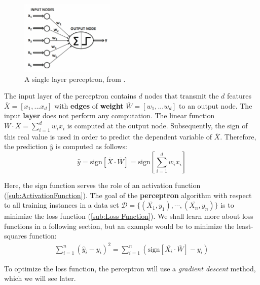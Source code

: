 \documentclass{article}
\begin{document}
\begin{figure} %
    \centering
    \includegraphics[width=0.4\textwidth]{SingleLayerP}
    \caption{A single layer perceptron, from \cite{inbook:Aggarwal-1.2}.}
    \label{fig:SLP}
\end{figure}

The input layer of the {perceptron} contains $d$ nodes that transmit the $d$ features $\overline{X} = [x_1, . . . x_d]$ with \textbf{edges} of \textbf{weight} $\overline{W} = [w_1, . . . w_d]$  to an output node. The input \textbf{layer} does not perform any computation. The linear function $\overline{W} \cdot \overline{X} =\sum^{d}_{i=1}  w_ix_i$ is computed at the output node. Subsequently, the sign of this real value is used in order to predict the dependent variable of $\overline{X}$. Therefore, the prediction $\hat y$ is computed as follows:
    $$\hat y = \text{sign}[\overline{X} \cdot \overline{W}] =\text{sign}\left[\sum^{d}_{i=1}  w_ix_i\right] $$

Here, the sign function serves the role of an activation function (\autoref{sub:ActivationFunction}). The goal of the \textbf{perceptron} algorithm with respect to all training instances in a data set $\mathcal{D} = \{(\overline{X_1}, y_1 ), \cdots,(\overline{X_n}, y_n )\}$ is to minimize the loss function (\autoref{sub:Loss Function}). We shall learn more about loss functions in a following section, but an example would be to minimize the least-squares function: 
 \begin{equation*}
  \begin{split}
    \sum^{n}_{i=1} (\hat y_i - y_i)^2 =\sum^{n}_{i=1} \left(\text{sign}[\overline{X_i} \cdot \overline{W}] -y_i \right)
  \end{split}
 \end{equation*}

 To optimize the loss function, the perceptron will use a \textit{gradient descent} method, which we will see later.
\end{document}
